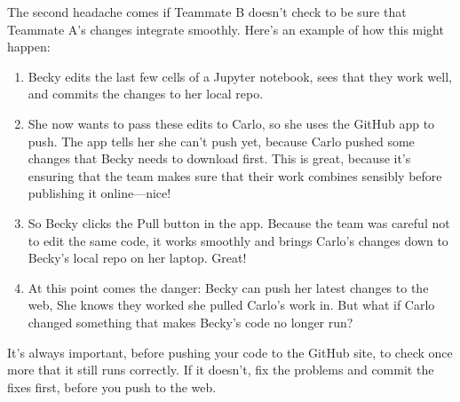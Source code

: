 \documentclass[letterpaper,10pt,english]{sphinxmanual}
\begin{document}
The second headache comes if Teammate B doesn’t check to be sure that Teammate A’s changes integrate smoothly.  Here’s an example of how this might happen:
\begin{enumerate}
%
\item {} 
Becky edits the last few cells of a Jupyter notebook, sees that they work well, and commits the changes to her local repo.

\item {} 
She now wants to pass these edits to Carlo, so she uses the GitHub app to push.  The app tells her she can’t push yet, because Carlo pushed some changes that Becky needs to download first.  This is great, because it’s ensuring that the team makes sure that their work combines sensibly before publishing it online—nice!

\item {} 
So Becky clicks the Pull button in the app.  Because the team was careful not to edit the same code, it works smoothly and brings Carlo’s changes down to Becky’s local repo on her laptop.  Great!

\item {} 
At this point comes the danger:  Becky can push her latest changes to the web,   She knows they worked  she pulled Carlo’s work in.  But what if Carlo changed something that makes Becky’s code no longer run?

\end{enumerate}

It’s always important, before pushing your code to the GitHub site, to check once more that it still runs correctly.  If it doesn’t, fix the problems and commit the fixes first, before you push to the web.
\end{document}
